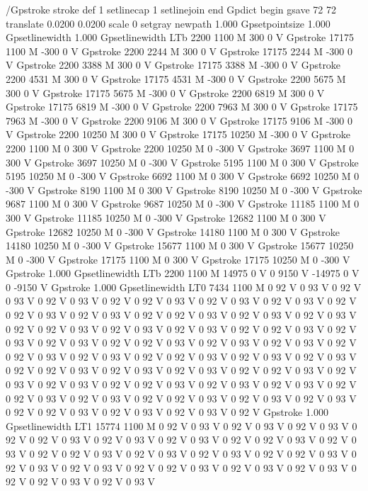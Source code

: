   /Gpstroke {stroke} def  
  1 setlinecap  
  1 setlinejoin 
end
Gpdict begin
gsave
72 72 translate
0.0200 0.0200 scale
0 setgray
newpath
1.000 Gpsetpointsize
1.000 Gpsetlinewidth
1.000 Gpsetlinewidth
LTb
2200 1100 M
300 0 V
Gpstroke
17175 1100 M
-300 0 V
Gpstroke
2200 2244 M
300 0 V
Gpstroke
17175 2244 M
-300 0 V
Gpstroke
2200 3388 M
300 0 V
Gpstroke
17175 3388 M
-300 0 V
Gpstroke
2200 4531 M
300 0 V
Gpstroke
17175 4531 M
-300 0 V
Gpstroke
2200 5675 M
300 0 V
Gpstroke
17175 5675 M
-300 0 V
Gpstroke
2200 6819 M
300 0 V
Gpstroke
17175 6819 M
-300 0 V
Gpstroke
2200 7963 M
300 0 V
Gpstroke
17175 7963 M
-300 0 V
Gpstroke
2200 9106 M
300 0 V
Gpstroke
17175 9106 M
-300 0 V
Gpstroke
2200 10250 M
300 0 V
Gpstroke
17175 10250 M
-300 0 V
Gpstroke
2200 1100 M
0 300 V
Gpstroke
2200 10250 M
0 -300 V
Gpstroke
3697 1100 M
0 300 V
Gpstroke
3697 10250 M
0 -300 V
Gpstroke
5195 1100 M
0 300 V
Gpstroke
5195 10250 M
0 -300 V
Gpstroke
6692 1100 M
0 300 V
Gpstroke
6692 10250 M
0 -300 V
Gpstroke
8190 1100 M
0 300 V
Gpstroke
8190 10250 M
0 -300 V
Gpstroke
9687 1100 M
0 300 V
Gpstroke
9687 10250 M
0 -300 V
Gpstroke
11185 1100 M
0 300 V
Gpstroke
11185 10250 M
0 -300 V
Gpstroke
12682 1100 M
0 300 V
Gpstroke
12682 10250 M
0 -300 V
Gpstroke
14180 1100 M
0 300 V
Gpstroke
14180 10250 M
0 -300 V
Gpstroke
15677 1100 M
0 300 V
Gpstroke
15677 10250 M
0 -300 V
Gpstroke
17175 1100 M
0 300 V
Gpstroke
17175 10250 M
0 -300 V
Gpstroke
1.000 Gpsetlinewidth
LTb
2200 1100 M
14975 0 V
0 9150 V
-14975 0 V
0 -9150 V
Gpstroke
1.000 Gpsetlinewidth
LT0
7434 1100 M
0 92 V
0 93 V
0 92 V
0 93 V
0 92 V
0 93 V
0 92 V
0 92 V
0 93 V
0 92 V
0 93 V
0 92 V
0 93 V
0 92 V
0 92 V
0 93 V
0 92 V
0 93 V
0 92 V
0 92 V
0 93 V
0 92 V
0 93 V
0 92 V
0 93 V
0 92 V
0 92 V
0 93 V
0 92 V
0 93 V
0 92 V
0 93 V
0 92 V
0 92 V
0 93 V
0 92 V
0 93 V
0 92 V
0 93 V
0 92 V
0 92 V
0 93 V
0 92 V
0 93 V
0 92 V
0 93 V
0 92 V
0 92 V
0 93 V
0 92 V
0 93 V
0 92 V
0 92 V
0 93 V
0 92 V
0 93 V
0 92 V
0 93 V
0 92 V
0 92 V
0 93 V
0 92 V
0 93 V
0 92 V
0 93 V
0 92 V
0 92 V
0 93 V
0 92 V
0 93 V
0 92 V
0 93 V
0 92 V
0 92 V
0 93 V
0 92 V
0 93 V
0 92 V
0 93 V
0 92 V
0 92 V
0 93 V
0 92 V
0 93 V
0 92 V
0 92 V
0 93 V
0 92 V
0 93 V
0 92 V
0 93 V
0 92 V
0 92 V
0 93 V
0 92 V
0 93 V
0 92 V
0 93 V
0 92 V
Gpstroke
1.000 Gpsetlinewidth
LT1
15774 1100 M
0 92 V
0 93 V
0 92 V
0 93 V
0 92 V
0 93 V
0 92 V
0 92 V
0 93 V
0 92 V
0 93 V
0 92 V
0 93 V
0 92 V
0 92 V
0 93 V
0 92 V
0 93 V
0 92 V
0 92 V
0 93 V
0 92 V
0 93 V
0 92 V
0 93 V
0 92 V
0 92 V
0 93 V
0 92 V
0 93 V
0 92 V
0 93 V
0 92 V
0 92 V
0 93 V
0 92 V
0 93 V
0 92 V
0 93 V
0 92 V
0 92 V
0 93 V
0 92 V
0 93 V
